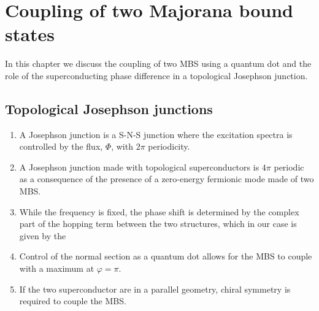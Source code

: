 \chapter{Coupling of two Majorana bound states}

In this chapter we discuss the coupling of two MBS using a quantum dot and the role of the superconducting phase difference in a topological Josephson junction.

\section{Topological Josephson junctions}

\begin{enumerate}
\item A Josephson junction is a S-N-S junction where the excitation spectra is controlled by the flux, $\Phi$, with $2\pi$ periodicity.
\item A Josephson junction made with topological superconductors is $4\pi$ periodic as a consequence of the presence of a zero-energy fermionic mode made of two MBS.
\item While the frequency is fixed, the phase shift is determined by the complex part of the hopping term between the two structures, which in our case is given by the 
\item Control of the normal section as a quantum dot allows for the MBS to couple with a maximum at $\varphi = \pi$.
\item If the two superconductor are in a parallel geometry, chiral symmetry is required to couple the MBS.
\end{enumerate}